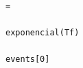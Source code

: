 \documentclass[10pt,a4paper]{article} %
\begin{document}
\begin{lstlisting}
                                                                                                                                                                                                                                                                                                                                                                                                                                                                                                                                                                                                                                                                                                                                                                                                                                                                                                                                                        =
                                                                                                                                                                                                                                                                                                                                                                                                                                                                                                                                                                                                                                                                                                                                                                                                                                                                                                                                                        exponencial(Tf)
                                                                                                                                                                                                                                                                                                                                                                                                                                                                                                                                                                                                                                                                                                                                                                                                                                                                                                                                                                        events[0]

\end{lstlisting}
\end{document}
